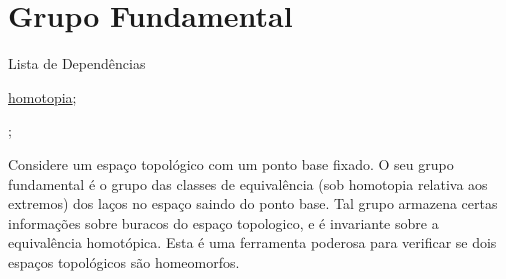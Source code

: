\section{Grupo Fundamental}
\label{grupo-fundamental}

\begin{titlemize}{Lista de Dependências}
	\item \hyperref[Homotopia]{homotopia};\\ %
	\item \hyperref[]{};
\end{titlemize}

Considere um espaço topológico com um ponto base fixado. O seu grupo fundamental é o grupo das classes de equivalência (sob homotopia relativa aos extremos) dos laços no espaço saindo do ponto base. Tal grupo armazena certas informações sobre buracos do espaço topologico, e é invariante sobre a equivalência homotópica. Esta é uma ferramenta poderosa para verificar se dois espaços topológicos são homeomorfos.%






